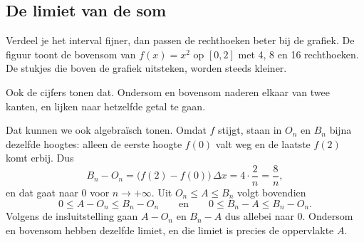 \begin{oefeningen}
\end{oefeningen}

\subsection{De limiet van de som}

Verdeel je het interval fijner, dan passen de rechthoeken beter bij de grafiek. De figuur toont de bovensom van $f(x) = x^2$ op $[0, 2]$ met 4, 8 en 16 rechthoeken. De stukjes die boven de grafiek uitsteken, worden steeds kleiner.


Ook de cijfers tonen dat. Ondersom en bovensom naderen elkaar van twee kanten, en lijken naar hetzelfde getal te gaan.


Dat kunnen we ook algebraïsch tonen. Omdat $f$ stijgt, staan in $O_n$ en $B_n$ bijna dezelfde hoogtes: alleen de eerste hoogte $f(0)$ valt weg en de laatste $f(2)$ komt erbij. Dus
\[ B_n - O_n = \bigl(f(2) - f(0)\bigr)\,\Delta x = 4 \cdot \frac{2}{n} = \frac{8}{n} , \]
en dat gaat naar 0 voor $n \to +\infty$. Uit $O_n \leqslant A \leqslant B_n$ volgt bovendien
\[ 0 \leqslant A - O_n \leqslant B_n - O_n \qquad\text{en}\qquad 0 \leqslant B_n - A \leqslant B_n - O_n . \]
Volgens de insluitstelling gaan $A - O_n$ en $B_n - A$ dus allebei naar 0. Ondersom en bovensom hebben dezelfde limiet, en die limiet is precies de oppervlakte $A$.

